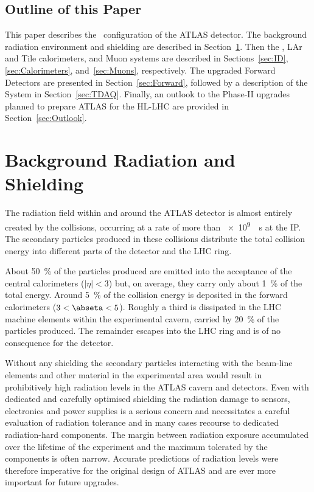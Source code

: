 \documentclass[cernpreprint, atlasdraft=false, UKenglish,british,orcidlogo, texmf, orcidlogo]{atlasdoc}
\begin{document}
\subsection{Outline of this Paper}
 
This paper describes the \RunThr\ configuration of the ATLAS detector. The background radiation environment and shielding are described in Section~\ref{sec:BkgRadiation}. Then the , \gls{LAr} and Tile calorimeters, and Muon systems are described in Sections~\ref{sec:ID}, \ref{sec:Calorimeters}, and~\ref{sec:Muons}, respectively. The upgraded Forward Detectors are presented in Section~\ref{sec:Forward}, followed by a description of the  System in Section~\ref{sec:TDAQ}. Finally, an outlook to the Phase-II upgrades planned to prepare ATLAS for the \gls{HL-LHC} are provided in Section~\ref{sec:Outlook}.
 


\clearpage
\newpage
 
 
 
\section{Background Radiation and Shielding} 
\label{sec:BkgRadiation}
 

 
The radiation field within and around the ATLAS detector is almost entirely created by the \pp collisions,
occurring at a rate of more than \SI{e9}{\per\s} 
at the \gls{IP}. The secondary particles produced in
these collisions distribute the total collision energy into different parts of the detector
and the \gls{LHC} ring.
 
About \SI{50}{\percent} of the particles produced are emitted into the acceptance of the central calorimeters
($|\eta| < 3$) but, on average, they carry only about \SI{1}{\percent} of the total energy. Around \SI{5}{\percent} of the collision energy
is deposited in the forward calorimeters ($3 < \abseta < 5$). Roughly a third is dissipated in the \gls{LHC} machine elements within the
experimental cavern, carried by \SI{20}{\percent} of the particles produced.
The remainder escapes into the \gls{LHC} ring and is of no consequence for the
detector.
 
Without any shielding the secondary particles interacting with the beam-line
elements and other material in the experimental area would result in prohibitively high radiation
levels in the ATLAS cavern and detectors. Even with dedicated and carefully optimised shielding
the radiation damage to sensors, electronics and power supplies is a serious concern and necessitates
a careful evaluation of radiation tolerance and in many cases recourse to dedicated radiation-hard
components. The margin between radiation exposure accumulated over the lifetime of the experiment and
the maximum tolerated by the components is often narrow. Accurate predictions of radiation
levels were therefore imperative for the original design of ATLAS and are ever more important for future upgrades.
 
\end{document}
